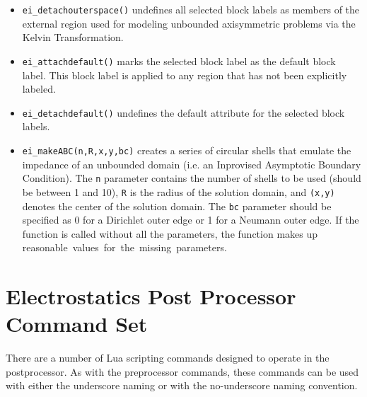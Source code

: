 \begin{itemize}
\item{\tt ei\_detachouterspace()} undefines all selected block labels
as members of the external region used for modeling unbounded axisymmetric
problems via the Kelvin Transformation.

\item{\tt ei\_attachdefault()} marks the
selected block label as the default block label.  This block label
is applied to any region that has not been explicitly labeled.

\item{\tt ei\_detachdefault()} undefines the default
attribute for the selected block labels.

\item{\tt ei\_makeABC(n,R,x,y,bc)} creates a series of circular shells that emulate the
impedance of an unbounded domain (i.e. an Inprovised Asymptotic Boundary
Condition).  The {\tt n} parameter contains the number of shells to be used
(should be between 1 and 10), {\tt R} is the radius of the solution domain, and
{\tt (x,y)} denotes the center of the solution domain.  The {\tt bc} parameter should
be specified as 0 for a Dirichlet outer edge or 1 for a Neumann outer edge.
If the function is called without all the parameters, the function makes up
reasonable values for the missing parameters. 

\end{itemize}

\section{Electrostatics Post Processor Command Set}

There are a number of Lua scripting commands designed to operate in
the postprocessor. As with the preprocessor commands, these
commands can be used with either the underscore naming or with the
no-underscore naming convention.

